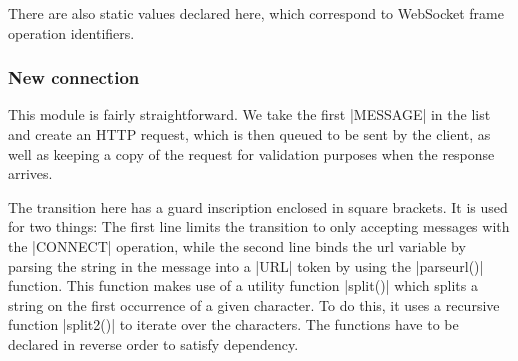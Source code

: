 	There are also static values declared here, which correspond to WebSocket
	frame operation identifiers.
	
	\subsubsection{New connection}
		
		
		This module is fairly straightforward. We take the first |MESSAGE|
		in the list and create an HTTP request, which is then queued to be sent by the
		client, as well as keeping a copy of the request for validation purposes when
		the response arrives.
		
		The transition here has a guard inscription enclosed in square brackets. It is
		used for two things:
		The first line limits the transition to only accepting messages with the
		|CONNECT|	operation, while the second line binds the url variable
		by parsing the string in the message into a |URL|
		token by using the |parseurl()| function. This function makes use of
		a utility function |split()|  which splits a string on the first
		occurrence of a given character. To do this, it uses a recursive function
		|split2()| to iterate over the characters. The functions have to be
		declared in reverse order to satisfy dependency.
		
		
		

